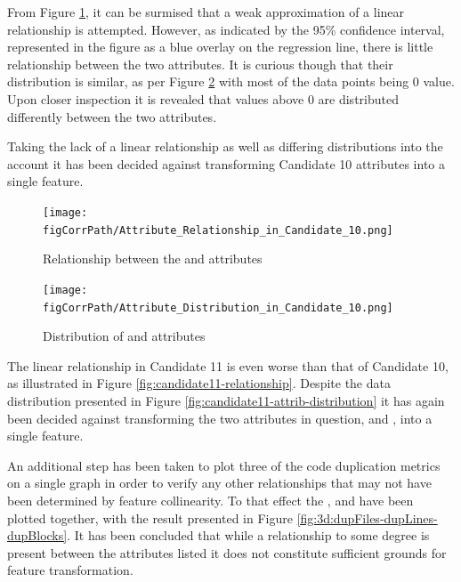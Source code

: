 From Figure \ref{fig:candidate10-relationship}, it can be surmised that a weak approximation of a linear relationship is attempted. However, as indicated by the 95\% confidence interval, represented in the figure as a blue overlay on the regression line, there is little relationship between the two attributes. It is curious though that their distribution is similar, as per Figure \ref{fig:candidate10-attrib-distribution} with most of the data points being 0 value. Upon closer inspection it is revealed that values above 0 are distributed differently between the two attributes.

Taking the lack of a linear relationship as well as differing distributions into the account it has been decided against transforming Candidate 10 attributes into a single feature.

\begin{figure}[!h]
     \centering
  \texttt{[image: \\figCorrPath/Attribute\_Relationship\_in\_Candidate\_10.png]}
    \caption{Relationship between the \duplicatedLines{} and \duplicatedLinesDensity{} attributes}
    \label{fig:candidate10-relationship}
\end{figure}

\begin{figure}[!h]
    \centering
   \texttt{[image: \\figCorrPath/Attribute\_Distribution\_in\_Candidate\_10.png]}
    \caption{Distribution of \duplicatedLines{} and \duplicatedLinesDensity{} attributes}
    \label{fig:candidate10-attrib-distribution}
\end{figure}

The linear relationship in Candidate 11 is even worse than that of Candidate 10, as illustrated in Figure \ref{fig:candidate11-relationship}. Despite the data distribution presented in Figure \ref{fig:candidate11-attrib-distribution} it has again been decided against transforming the two attributes in question, \duplicatedBlocks{} and \duplicatedFiles{}, into a single feature.

An additional step has been taken to plot three of the code duplication metrics on a single graph in order to verify any other relationships that may not have been determined by feature collinearity. To that effect the \duplicatedFiles{}, \duplicatedLines{} and \duplicatedBlocks{} have been plotted together, with the result presented in Figure \ref{fig:3d:dupFiles-dupLines-dupBlocks}. It has been concluded that while a relationship to some degree is present between the attributes listed it does not constitute sufficient grounds for feature transformation.

